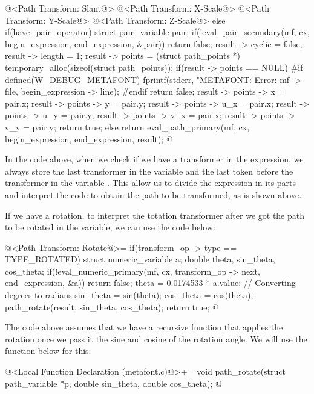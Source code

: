 {{    @<Path Transform: Slant@>
    @<Path Transform: X-Scale@>
    @<Path Transform: Y-Scale@>
    @<Path Transform: Z-Scale@>
  }
  else if(have_pair_operator){
    struct pair_variable pair;
    if(!eval_pair_secundary(mf, cx, begin_expression, end_expression, &pair))
      return false;
    result -> cyclic = false;
    result -> length = 1;
    result -> points = (struct path_points *)
                         temporary_alloc(sizeof(struct path_points));
    if(result -> points == NULL){
#if defined(W_DEBUG_METAFONT)
      fprintf(stderr, "METAFONT: Error: %
              mf -> file, begin_expression -> line);
#endif
      return false;
    }
    result -> points -> x = pair.x;
    result -> points -> y = pair.y;
    result -> points -> u_x = pair.x;
    result -> points -> u_y = pair.y;
    result -> points -> v_x = pair.x;
    result -> points -> v_y = pair.y;
    return true;    
  }
  else
    return eval_path_primary(mf, cx, begin_expression, end_expression,
                             result);
}
@
\fimcodigo

In the code above, when we check if we have a transformer in the
expression, we always store the last transformer in the
variable  and the last token before the
transformer in the variable . This allow
us to divide the expression in its parts and interpret the code to
obtain the path to be transformed, as is shown above.

If we have a rotation, to interpret the totation transformer after we
got the path to be rotated in the  variable, we can
use the code below:

\iniciocodigo
@<Path Transform: Rotate@>=
if(transform_op -> type == TYPE_ROTATED){
  struct numeric_variable a;
  double theta, sin_theta, cos_theta;
  if(!eval_numeric_primary(mf, cx, transform_op -> next, end_expression,
                           &a))
    return false;
  theta = 0.0174533 * a.value; // Converting degrees to radians
  sin_theta = sin(theta);
  cos_theta = cos(theta);
  path_rotate(result, sin_theta, cos_theta);
  return true;
}
@
\fimcodigo

The code above assumes that we have a recursive function that applies
the rotation once we pass it the sine and cosine of the rotation
angle. We will use the function below for this:

\iniciocodigo
@<Local Function Declaration (metafont.c)@>+=
void path_rotate(struct path_variable *p, double sin_theta,
                 double cos_theta);
@
\fimcodigo

